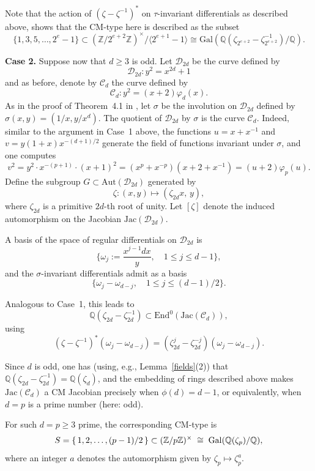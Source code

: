 \documentclass[a4paper,12pt]{amsart}
\newcommand{\QQ}{{\mathbb Q}}
\def\Gal{{\rm Gal}}
\def\cC{{\mathcal C}}
\def\cD{{\mathcal D}}
\numberwithin{equation}{section}
\theoremstyle{plain}
\numberwithin{thm}{section}
\begin{document}
 Note that the action of
 $(\zeta-\zeta^{-1})^*$ on $\tau$-invariant differentials as described above,
 shows that the CM-type here is described as the subset
 \[ \{1, 3, 5, \ldots, 2^e-1\}\subset(\mathbb{Z}/2^{e+2}\mathbb{Z})^\times/\langle 2^{e+1}-1\rangle\cong\textrm{Gal}(\mathbb{Q}(\zeta_{2^{e+2}}-\zeta_{2^{e+2}}^{-1})/\mathbb{Q}).\]


\medskip
\noindent
\textbf{Case 2.} 
Suppose now that $d  \geq 3$ is odd.  
Let $\cD_{2d}$ be the curve defined by
\[
\cD_{2d} : y^{2} = x^{2d} + 1
\]
and as before, denote by $\cC_d$ the curve defined by
\[
\cC_d\colon  y^{2} = (x+2)\varphi_{d}(x).
\]
As in the proof of Theorem~4.1 in \cite{TT},
let $\sigma$ be the involution on $\cD_{2d}$ defined by $\sigma(x,y)=(1/x,y/x^d)$.
The quotient of $\cD_{2d}$ by $\sigma$ is the curve
$\cC_d$. Indeed, similar to the argument
in Case~1 above, the functions $u=x+x^{-1}$ and $v=y(1+x)x^{-(d+1)/2}$
generate the field of functions invariant under $\sigma$,
and one computes
\[ v^2=y^2\cdot x^{-(p+1)}\cdot(x+1)^2=(x^p+x^{-p})(x+2+x^{-1})=(u+2)\varphi_p(u).\]
Define the subgroup $G \subset \mbox{Aut}(\cD_{2d})$ generated by
\[
\zeta: (x,y) \mapsto (\zeta_{2d} x, \,  y),
\]
where $\zeta_{2d}$ is a primitive $2d$-th root of unity. Let $[\zeta]$ denote the induced automorphism on the Jacobian $\textrm{Jac}(\cD_{2d})$.

 A basis of the space of regular differentials on $\cD_{2d}$ is
\[
\{ \omega_j := \frac{x^{j-1} dx}{y}, \quad 1 \le j \le d-1 \},
\]
and the $\sigma$-invariant differentials admit as a basis
\[
\{ \omega_j - \omega_{d-j}, \quad 1 \le j \le (d-1)/2 \}.
\]

Analogous to Case~1, this leads to
\[
\QQ(\zeta_{2d}-\zeta_{2d}^{-1}) \subset \mbox{End}^0(\textrm{Jac}(\cC_d)),
\]
using
\[
(\zeta-\zeta^{-1})^{*}(\omega_j-\omega_{d-j}) 
= (\zeta_{2d}^{j}-\zeta_{2d}^{-j})(\omega_j-\omega_{d-j}).
\]

 Since $d$ is odd, one has (using, e.g., Lemma~\ref{fields}(2)) that
$\mathbb{Q}(\zeta_{2d}-\zeta_{2d}^{-1})=\mathbb{Q}(\zeta_{d})$,
and the embedding of rings described above
makes $\textrm{Jac}(\cC_d)$ a CM Jacobian precisely when
$\phi(d)=d-1$, or equivalently, when $d=p$ is a prime number (here: odd).


For such $d=p\geq 3$ prime, the corresponding CM-type is
\[
    S = \{\,1,2,\dots,(p-1)/2\,\} \subset (\mathbb{Z}/p\mathbb{Z})^\times
    \;\cong\; \Gal(\mathbb{Q}(\zeta_p)/\mathbb{Q}),
\]
where an integer $a$ denotes the automorphism given by $\zeta_p \mapsto \zeta_p^a$.
\end{document}
